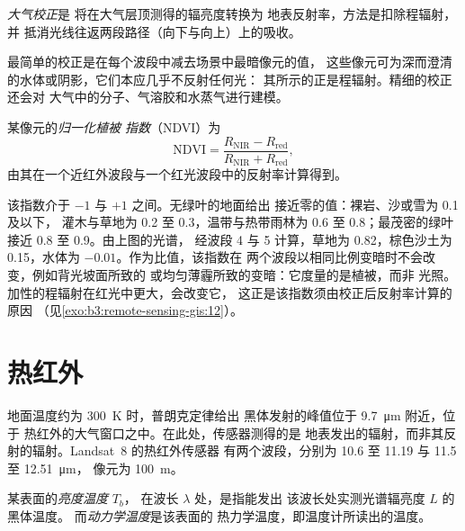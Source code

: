 \begin{definition}[大气校正]\label{def:b3:remote-sensing-gis:atm-correction}
\emph{大气校正}是
将在大气层顶测得的辐亮度转换为
地表反射率，方法是扣除程辐射，并
抵消光线往返两段路径（向下与向上）上的吸收。
\end{definition}

最简单的校正是在每个波段中减去场景中最暗像元的值，
这些像元可为深而澄清的水体或阴影，它们本应几乎不反射任何光：
其所示的正是程辐射。精细的校正还会对
大气中的分子、气溶胶和水蒸气进行建模。

\begin{definition}[归一化植被指数]\label{def:b3:remote-sensing-gis:ndvi}
某像元的\emph{归一化植被
指数}（NDVI）为
\[
\mathrm{NDVI} = \frac{R_\mathrm{NIR} - R_\mathrm{red}}{R_\mathrm{NIR} + R_\mathrm{red}} ,
\]
由其在一个近红外波段与一个红光波段中的反射率计算得到。
\end{definition}

该指数介于 $-1$ 与 $+1$ 之间。无绿叶的地面给出
接近零的值：裸岩、沙或雪为 \num{0.1} 及以下，
灌木与草地为 0.2 至 0.3，温带与热带雨林为 0.6 至
0.8；最茂密的绿叶接近 0.8 至 0.9。由上图的光谱，
经波段 4 与 5 计算，草地为 0.82，棕色沙土为
0.15，水体为 $-0.01$。作为比值，该指数在
两个波段以相同比例变暗时不会改变，例如背光坡面所致的
或均匀薄霾所致的变暗：它度量的是植被，而非
光照。加性的程辐射在红光中更大，会改变它，
这正是该指数须由校正后反射率计算的原因
（见\cref{exo:b3:remote-sensing-gis:12}）。

\section{热红外}\label{sec:b3:remote-sensing-gis:thermal}

地面温度约为 \qty{300}{K} 时，普朗克定律给出
黑体发射的峰值位于 \qty{9.7}{\micro\metre} 附近，位于
热红外的大气窗口之中。在此处，传感器测得的是
地表发出的辐射，而非其反射的辐射。Landsat~8 的热红外传感器
有两个波段，分别为 10.6 至 11.19 与 11.5 至 \qty{12.51}{\micro\metre}，
像元为 \qty{100}{m}。

\begin{definition}[亮度温度]\label{def:b3:remote-sensing-gis:brightness}
某表面的\emph{亮度温度} $T_b$，
在波长 $\lambda$ 处，是指能发出
该波长处实测光谱辐亮度 $L$ 的黑体温度。
而\emph{动力学温度}是该表面的
热力学温度，即温度计所读出的温度。
\end{definition}

